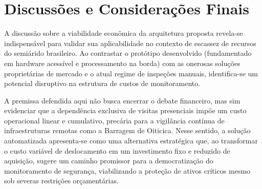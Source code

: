 \chapter{Discussões e Considerações Finais}
\label{cap:cap6}

A discussão sobre a viabilidade econômica da arquitetura proposta revela-se indispensável para validar sua aplicabilidade no contexto de escassez de recursos do semiárido brasileiro. Ao contrastar o protótipo desenvolvido (fundamentado em hardware acessível e processamento na borda) com as onerosas soluções proprietárias de mercado e o atual regime de inspeções manuais, identifica-se um potencial disruptivo na estrutura de custos de monitoramento.

A premissa defendida aqui não busca encerrar o debate financeiro, mas sim evidenciar que a dependência exclusiva de visitas presenciais impõe um custo operacional linear e cumulativo, precária para a vigilância contínua de infraestruturas remotas como a Barragem de Oiticica. Nesse sentido, a solução automatizada apresenta-se como uma alternativa estratégica que, ao transformar o custo variável de deslocamento em um investimento fixo e reduzido de aquisição, sugere um caminho promissor para a democratização do monitoramento de segurança, viabilizando a proteção de ativos críticos mesmo sob severas restrições orçamentárias.
